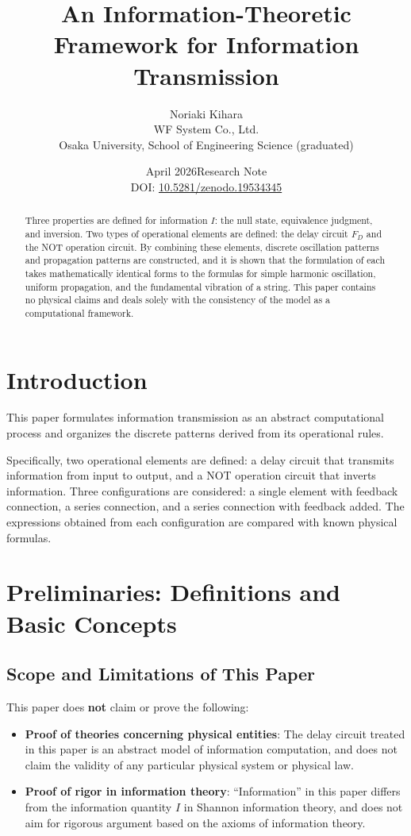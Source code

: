 \documentclass[12pt,a4paper]{article}
\title{An Information-Theoretic Framework for Information Transmission}
\author{Noriaki Kihara\\
WF System Co., Ltd.\\
Osaka University, School of Engineering Science (graduated)}
\date{April 2026\quad Research Note\\[4pt]
DOI: \href{https://doi.org/10.5281/zenodo.19534345}{10.5281/zenodo.19534345}}
\begin{document}
\maketitle

\begin{abstract}
Three properties are defined for information $I$: the null state, equivalence judgment, and inversion. Two types of operational elements are defined: the delay circuit $F_D$ and the NOT operation circuit. By combining these elements, discrete oscillation patterns and propagation patterns are constructed, and it is shown that the formulation of each takes mathematically identical forms to the formulas for simple harmonic oscillation, uniform propagation, and the fundamental vibration of a string. This paper contains no physical claims and deals solely with the consistency of the model as a computational framework.
\end{abstract}

\section{Introduction}

This paper formulates information transmission as an abstract computational process and organizes the discrete patterns derived from its operational rules.

Specifically, two operational elements are defined: a delay circuit that transmits information from input to output, and a NOT operation circuit that inverts information. Three configurations are considered: a single element with feedback connection, a series connection, and a series connection with feedback added. The expressions obtained from each configuration are compared with known physical formulas.

\section{Preliminaries: Definitions and Basic Concepts}

\subsection{Scope and Limitations of This Paper}

This paper does \textbf{not} claim or prove the following:

\begin{itemize}
  \item \textbf{Proof of theories concerning physical entities}: The delay circuit treated in this paper is an abstract model of information computation, and does not claim the validity of any particular physical system or physical law.
  \item \textbf{Proof of rigor in information theory}: ``Information'' in this paper differs from the information quantity $I$ in Shannon information theory, and does not aim for rigorous argument based on the axioms of information theory.
\end{itemize}
\end{document}
